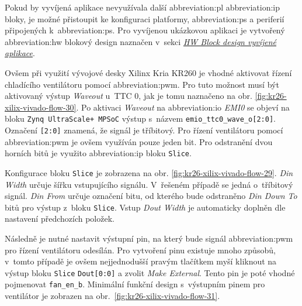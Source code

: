 \documentclass[a4paper, twoside, 11pt]{article}
\begin{document}
				Pokud by vyvíjená aplikace nevyužívala další \gls{abbreviation:pl} \gls{abbreviation:ip} bloky, je možné přistoupit ke konfiguraci platformy, \gls{abbreviation:ps} a periferií připojených k~\gls{abbreviation:ps}. Pro vyvíjenou ukázkovou aplikaci je vytvořený \gls{abbreviation:hw} blokový design naznačen v~sekci \hyperref[subsubsec:hw-block-design-vyvijene-aplikace]{\textit{HW Block design vyvíjené aplikace}}.\par
				Ovšem při využití vývojové desky Xilinx Kria KR260 je vhodné aktivovat řízení chladícího ventilátoru pomocí \gls{abbreviation:pwm}. Pro tuto možnost musí být aktivovaný výstup \textit{Waveout} u~TTC 0, jak je tomu naznačeno na obr. \ref{fig:kr26-xilix-vivado-flow-30}. Po aktivaci \textit{Waveout} na \gls{abbreviation:io} \textit{EMI0} se objeví na bloku \texttt{Zynq UltraScale+ MPSoC} výstup s~názvem \texttt{emio\_ttc0\_wave\_o[2:0]}. Označení \texttt{[2:0]} znamená, že signál je tříbitový. Pro řízení ventilátoru pomocí \gls{abbreviation:pwm} je ovšem využíván pouze jeden bit. Pro odstranění dvou horních bitů je využito \gls{abbreviation:ip} bloku \texttt{Slice}.\par
				Konfigurace bloku \texttt{Slice} je zobrazena na obr. \ref{fig:kr26-xilix-vivado-flow-29}. \textit{Din Width} určuje šířku vstupujícího signálu. V~řešeném případě se jedná o~tříbitový signál. \textit{Din From} určuje označení bitu, od kterého bude odstraněno \textit{Din Down To} bitů pro výstup z~bloku \texttt{Slice}. Vstup \textit{Dout Width} je automaticky doplněn dle nastavení předchozích položek.\par
				Následně je nutné nastavit výstupní pin, na který bude signál \gls{abbreviation:pwm} pro řízení ventilátoru odesílán. Pro vytvoření pinu existuje mnoho způsobů, v~tomto případě je ovšem nejjednodušší pravým tlačítkem myší kliknout na výstup bloku \texttt{Slice} \texttt{Dout[0:0]} a zvolit \textit{Make External}. Tento pin je poté vhodné pojmenovat \texttt{fan\_en\_b}. Minimální funkční design s~výstupním pinem pro ventilátor je zobrazen na obr.~\ref{fig:kr26-xilix-vivado-flow-31}.
\end{document}
